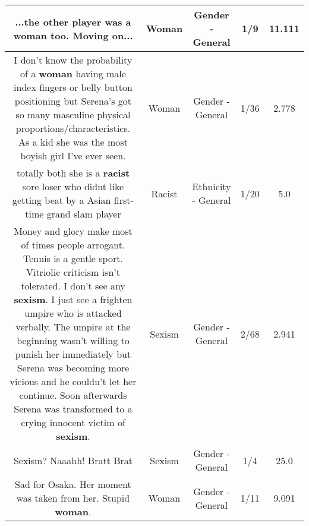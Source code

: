 \documentclass[11pt]{article}
\newlength\mylength
\begin{document}
\begin{center}
\begin{longtable}{|C{.65\mylength}|C{.30\mylength}|C{.12\mylength}|C{.12\mylength}|C{.12\mylength}|}
  \small ...the other player was a \textbf{woman} too. Moving on...\normalsize   & Woman & Gender - General & 1/9 & 11.111 \\  \hline
  \small I don't know the probability of a \textbf{woman} having male index fingers or belly button positioning but Serena's got so many masculine physical proportions/characteristics. As a kid she was the most boyish girl I've ever seen.\normalsize   & Woman & Gender - General & 1/36 & 2.778 \\  \hline
  \small totally both she is a \textbf{racist} sore loser who didnt like getting beat by a Asian first-time grand slam player\normalsize   & Racist & Ethnicity - General & 1/20 & 5.0 \\  \hline
  \small Money and glory make most of times people arrogant. Tennis is a gentle sport. Vitriolic criticism isn't tolerated. I don't see any \textbf{sexism}. I just see a frighten umpire who is attacked verbally. The umpire at the beginning wasn't willing to punish her immediately but Serena was becoming more vicious and he couldn't let her continue. Soon afterwards Serena was transformed to a crying innocent victim of \textbf{sexism}.\normalsize   & Sexism & Gender - General & 2/68 & 2.941 \\  \hline
  \small Sexism? Naaahh!  Bratt Brat\normalsize   & Sexism & Gender - General & 1/4 & 25.0 \\  \hline
  \small Sad for Osaka. Her moment was taken from her. Stupid \textbf{woman}.\normalsize   & Woman & Gender - General & 1/11 & 9.091 \\  \hline

\end{longtable}
\end{center}
\end{document}
